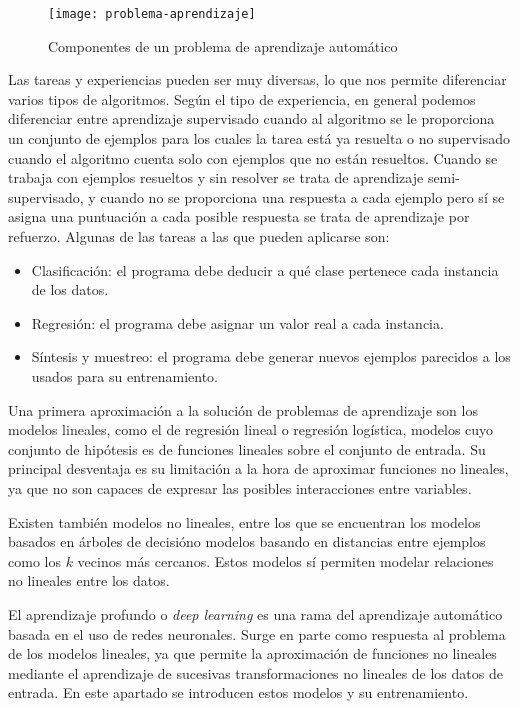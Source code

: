 \begin{figure}[htpb]
  \centering
  \texttt{[image: problema-aprendizaje]}
  \caption{Componentes de un problema de aprendizaje automático}
  \label{fig:problema-aprendizaje}
\end{figure}

Las tareas y experiencias pueden ser muy diversas, lo que nos permite diferenciar varios tipos de algoritmos. Según el tipo de experiencia, en general podemos diferenciar entre aprendizaje supervisado cuando al algoritmo se le proporciona un conjunto de ejemplos para los cuales la tarea está ya resuelta o no supervisado cuando el algoritmo cuenta solo con ejemplos que no están resueltos. Cuando se trabaja con ejemplos resueltos y sin resolver se trata de aprendizaje semi-supervisado, y cuando no se proporciona una respuesta a cada ejemplo pero sí se asigna una puntuación a cada posible respuesta se trata de aprendizaje por refuerzo. Algunas de las tareas a las que pueden aplicarse son:

\begin{itemize}
  \item Clasificación: el programa debe deducir a qué clase pertenece cada instancia de los datos.
  \item Regresión: el programa debe asignar un valor real a cada instancia.
  \item Síntesis y muestreo: el programa debe generar nuevos ejemplos parecidos a los usados para su entrenamiento.
\end{itemize}

Una primera aproximación a la solución de problemas de aprendizaje son los modelos lineales, como el de regresión lineal o regresión logística, modelos cuyo conjunto de hipótesis es de funciones lineales sobre el conjunto de entrada. Su principal desventaja es su limitación a la hora de aproximar funciones no lineales, ya que no son capaces de expresar las posibles interacciones entre variables.

Existen también modelos no lineales, entre los que se encuentran los modelos basados en árboles de decisióno modelos basando en distancias entre ejemplos como los $k$ vecinos más cercanos. Estos modelos sí permiten modelar relaciones no lineales entre los datos.

El aprendizaje profundo o \textit{deep learning} es una rama del aprendizaje automático basada en el uso de redes neuronales. Surge en parte como respuesta al problema de los modelos lineales, ya que permite la aproximación de funciones no lineales mediante el aprendizaje de sucesivas transformaciones no lineales de los datos de entrada. En este apartado se introducen estos modelos y su entrenamiento.

